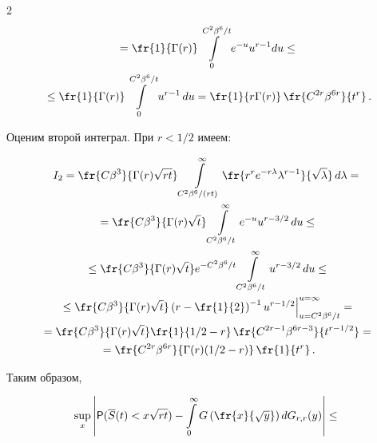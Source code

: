 \begin{multicols}{2}
\begin{multline*}
{}=\fr{1}{\Gamma(r)}\int\limits_0^{C^2\beta^6/t}e^{-u}u^{r-1}du \le{}\\


{}\le


\fr{1}{\Gamma(r)}\int\limits_0^{C^2\beta^6/t}u^{r-1}\,du


=\fr{1}{r\Gamma(r)}\,\fr{C^{2r}\beta^{6r}}{t^r}\,.


\end{multline*}


Оценим второй интеграл. При $r<1/2$ имеем:


\begin{multline*}


I_2=\fr{C\beta^3}{\Gamma(r)\sqrt{ r


t}}\int\limits_{C^2\beta^6/(rt)}^{\infty}\fr{r^r


e^{-r\lambda}\lambda^{r-1} }{\sqrt{\lambda}}\,d\lambda


={}\\


{}=\fr{C\beta^3}{\Gamma(r)\sqrt{t}}


\int\limits_{C^2\beta^6/t}^{\infty}e^{-u}u^{r-3/2}\,du\le{}\\


{}


\le\fr{C\beta^3}{\Gamma(r)\sqrt{t}}e^{-C^2\beta^6/t}


\int\limits_{C^2\beta^6/t}^{\infty}u^{r-3/2}\,du\le{}\\


{}\le


\fr{C\beta^3}{\Gamma(r)\sqrt{t}}\left(r-\fr{1}{2}\right)^{-1}


u^{r-1/2}\Big|_{u=C^2\beta^6/t}^{u=\infty}={}\\


{}


=\fr{C\beta^3}{\Gamma(r)\sqrt{t}}\fr{1}{1/2-r}\,


\fr{C^{2r-1}\beta^{6r-3}}{t^{r-1/2}}={}\\


{}=


\fr{C^{2r}\beta^{6r}}{\Gamma(r)(1/2-r)}\,\fr{1}{t^r}\,.


\end{multline*}


Таким образом,


\begin{multline*}


 \sup\limits_x\left\vert{\sf P}(\overline S(t)<x\sqrt{rt})-\int\limits_{0}^{\infty}


G\left(\fr{x}{\sqrt{y}}\right)dG_{r,r}(y)\right\vert \le{}\\



\end{multline*}
\end{multicols}
